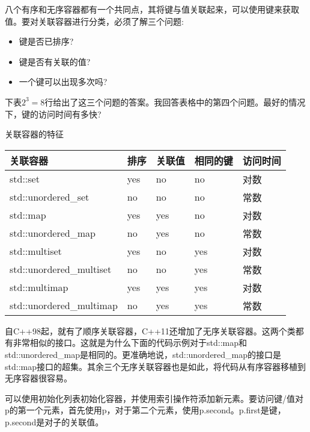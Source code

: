八个有序和无序容器都有一个共同点，其将键与值关联起来，可以使用键来获取值。要对关联容器进行分类，必须了解三个问题:

\begin{itemize}
\item 
键是否已排序?

\item 
键是否有关联的值?

\item 
一个键可以出现多次吗?
\end{itemize}

下表$2^3= 8$行给出了这三个问题的答案。我回答表格中的第四个问题。最好的情况下，键的访问时间有多快?


\begin{center}
关联容器的特征
\end{center}

\begin{longtable}[c]{|l|l|l|l|l|}
\hline
\textbf{关联容器} & \textbf{排序} & \textbf{关联值} & \textbf{相同的键} & \textbf{访问时间} \\ \hline
\endfirsthead
%
\endhead
%
std::set                 & yes & no  & no  & 对数 \\ \hline
std::unordered\_set      & no  & no  & no  & 常数    \\ \hline
std::map                 & yes & yes & no  & 对数 \\ \hline
std::unordered\_map      & no  & yes & no  & 常数    \\ \hline
std::multiset            & yes & no  & yes & 对数 \\ \hline
std::unordered\_multiset & no  & no  & yes & 常数    \\ \hline
std::multimap            & yes & yes & yes & 对数 \\ \hline
std::unordered\_multimap & no  & yes & yes & 常数    \\ \hline
\end{longtable}

自C++98起，就有了顺序关联容器，C++11还增加了无序关联容器。这两个类都有非常相似的接口。这就是为什么下面的代码示例对于std::map和std::unordered\_map是相同的。更准确地说，std::unordered\_map的接口是std::map接口的超集。其余三个无序关联容器也是如此，将代码从有序容器移植到无序容器很容易。

可以使用初始化列表初始化容器，并使用索引操作符添加新元素。要访问键/值对p的第一个元素，首先使用p，对于第二个元素，使用p.second。p.first是键，p.second是对子的关联值。

